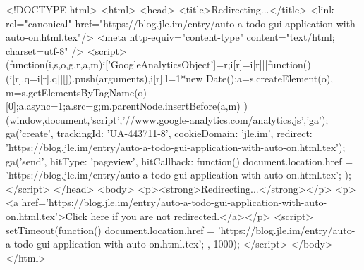 <!DOCTYPE html>
<html>
<head>
<title>Redirecting...</title>
<link rel="canonical" href="https://blog.jle.im/entry/auto-a-todo-gui-application-with-auto-on.html.tex"/>
<meta http-equiv="content-type" content="text/html; charset=utf-8" />
<script>
(function(i,s,o,g,r,a,m){i['GoogleAnalyticsObject']=r;i[r]=i[r]||function(){
(i[r].q=i[r].q||[]).push(arguments)},i[r].l=1*new Date();a=s.createElement(o),
m=s.getElementsByTagName(o)[0];a.async=1;a.src=g;m.parentNode.insertBefore(a,m)
})(window,document,'script','//www.google-analytics.com/analytics.js','ga');
ga('create', { trackingId: 'UA-443711-8', cookieDomain: 'jle.im', redirect: 'https://blog.jle.im/entry/auto-a-todo-gui-application-with-auto-on.html.tex'});
ga('send', { hitType: 'pageview', hitCallback: function() { document.location.href = 'https://blog.jle.im/entry/auto-a-todo-gui-application-with-auto-on.html.tex'; } });
</script>
</head>
<body>
  <p><strong>Redirecting...</strong></p>
  <p><a href='https://blog.jle.im/entry/auto-a-todo-gui-application-with-auto-on.html.tex'>Click here if you are not redirected.</a></p>
  <script>
    setTimeout(function() { document.location.href = 'https://blog.jle.im/entry/auto-a-todo-gui-application-with-auto-on.html.tex'; }, 1000);
  </script>
</body>
</html>

